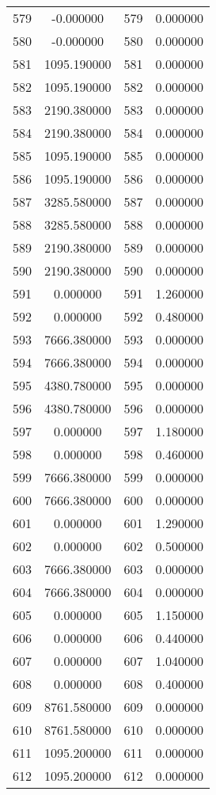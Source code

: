 \documentclass[12pt]{article}
\begin{document}
\begin{longtable}{@{}cccc@{}}
579 & -0.000000 & 579 & 0.000000 \\
580 & -0.000000 & 580 & 0.000000 \\
581 & 1095.190000 & 581 & 0.000000 \\
582 & 1095.190000 & 582 & 0.000000 \\
583 & 2190.380000 & 583 & 0.000000 \\
584 & 2190.380000 & 584 & 0.000000 \\
585 & 1095.190000 & 585 & 0.000000 \\
586 & 1095.190000 & 586 & 0.000000 \\
587 & 3285.580000 & 587 & 0.000000 \\
588 & 3285.580000 & 588 & 0.000000 \\
589 & 2190.380000 & 589 & 0.000000 \\
590 & 2190.380000 & 590 & 0.000000 \\
591 & 0.000000 & 591 & 1.260000 \\
592 & 0.000000 & 592 & 0.480000 \\
593 & 7666.380000 & 593 & 0.000000 \\
594 & 7666.380000 & 594 & 0.000000 \\
595 & 4380.780000 & 595 & 0.000000 \\
596 & 4380.780000 & 596 & 0.000000 \\
597 & 0.000000 & 597 & 1.180000 \\
598 & 0.000000 & 598 & 0.460000 \\
599 & 7666.380000 & 599 & 0.000000 \\
600 & 7666.380000 & 600 & 0.000000 \\
601 & 0.000000 & 601 & 1.290000 \\
602 & 0.000000 & 602 & 0.500000 \\
603 & 7666.380000 & 603 & 0.000000 \\
604 & 7666.380000 & 604 & 0.000000 \\
605 & 0.000000 & 605 & 1.150000 \\
606 & 0.000000 & 606 & 0.440000 \\
607 & 0.000000 & 607 & 1.040000 \\
608 & 0.000000 & 608 & 0.400000 \\
609 & 8761.580000 & 609 & 0.000000 \\
610 & 8761.580000 & 610 & 0.000000 \\
611 & 1095.200000 & 611 & 0.000000 \\
612 & 1095.200000 & 612 & 0.000000 \\

\end{longtable}
\end{document}
